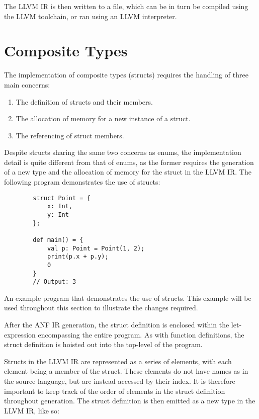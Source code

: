 The LLVM IR is then written to a file, which can be in turn be compiled using the LLVM toolchain, or
ran using an LLVM interpreter.

\section{Composite Types}

The implementation of composite types (structs) requires the handling of three main concerns:

\begin{enumerate}
    \singlespacing
    \item The definition of structs and their members.
    \item The allocation of memory for a new instance of a struct.
    \item The referencing of struct members.
\end{enumerate}

Despite structs sharing the same two concerns as enums, the implementation detail is quite different
from that of enums, as the former requires the generation of a new type and the allocation of memory
for the struct in the LLVM IR\@. The following program demonstrates the use of structs:

\begin{tcolorbox}
    \begin{verbatim}
        struct Point = {
            x: Int,
            y: Int
        };

        def main() = {
            val p: Point = Point(1, 2);
            print(p.x + p.y);
            0
        }
        // Output: 3
    \end{verbatim}
    \tcblower
    \footnotesize
    An example program that demonstrates the use of structs.
    This example will be used throughout this section to illustrate the changes required.
\end{tcolorbox}

After the ANF IR generation, the struct definition is enclosed within the let-expression
encompassing the entire program. As with function definitions, the struct definition is hoisted out
into the top-level of the program.

Structs in the LLVM IR are represented as a series of elements, with each element being a member of
the struct. These elements do not have names as in the source language, but are instead accessed by
their index. It is therefore important to keep track of the order of elements in the struct
definition throughout generation. The struct definition is then emitted as a new type in the LLVM
IR\@, like so:

